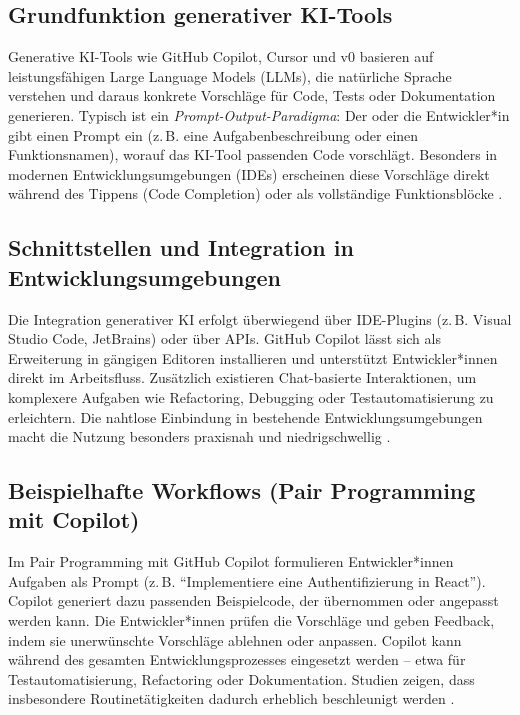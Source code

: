 \label{sec:generative-ki-tools}

\subsection{Grundfunktion generativer KI-Tools}

Generative KI-Tools wie GitHub Copilot, Cursor und v0 basieren auf
leistungsfähigen Large Language Models (LLMs), die natürliche Sprache verstehen
und daraus konkrete Vorschläge für Code, Tests oder Dokumentation generieren.
Typisch ist ein \textit{Prompt-Output-Paradigma}: Der oder die Entwickler*in
gibt einen Prompt ein (z.\,B. eine Aufgabenbeschreibung oder einen
Funktionsnamen), worauf das KI-Tool passenden Code vorschlägt. Besonders in
modernen Entwicklungsumgebungen (IDEs) erscheinen diese Vorschläge direkt
während des Tippens (Code Completion) oder als vollständige Funktionsblöcke
\cite{kerr_github_nodate,weisz_design_2024}.

\subsection{Schnittstellen und Integration in Entwicklungsumgebungen}

Die Integration generativer KI erfolgt überwiegend über IDE-Plugins (z.\,B.
Visual Studio Code, JetBrains) oder über APIs. GitHub Copilot lässt sich als
Erweiterung in gängigen Editoren installieren und unterstützt Entwickler*innen
direkt im Arbeitsfluss. Zusätzlich existieren Chat-basierte Interaktionen, um
komplexere Aufgaben wie Refactoring, Debugging oder Testautomatisierung zu
erleichtern. Die nahtlose Einbindung in bestehende Entwicklungsumgebungen macht
die Nutzung besonders praxisnah und niedrigschwellig
\cite{kerr_github_nodate,shi_ai-assisted_2023,weisz_design_2024}.

\subsection{Beispielhafte Workflows (Pair Programming mit Copilot)}

Im Pair Programming mit GitHub Copilot formulieren Entwickler*innen Aufgaben
als Prompt (z.\,B. ``Implementiere eine Authentifizierung in React''). Copilot
generiert dazu passenden Beispielcode, der übernommen oder angepasst werden
kann. Die Entwickler*innen prüfen die Vorschläge und geben Feedback, indem sie
unerwünschte Vorschläge ablehnen oder anpassen. Copilot kann während des
gesamten Entwicklungsprozesses eingesetzt werden – etwa für
Testautomatisierung, Refactoring oder Dokumentation. Studien zeigen, dass
insbesondere Routinetätigkeiten dadurch erheblich beschleunigt werden
\cite{kerr_github_nodate,weisz_design_2024,shi_ai-assisted_2023}.

